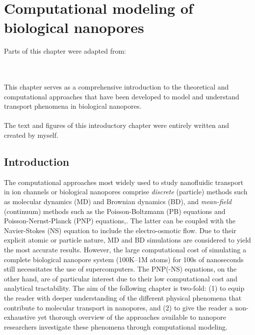 %
\chapter{Computational modeling of biological nanopores}
%
\label{ch:modelling}
%



\begin{shaded}
Parts of this chapter were adapted from:\\
\\
\\
\newpage
\end{shaded}

This chapter serves as a comprehensive introduction to the theoretical and computational approaches that have been developed to model and understand transport phenomena in biological nanopores. \\
\\
The text and figures of this introductory chapter were entirely written and created by myself.


\section{Introduction}

The computational approaches most widely used to study nanofluidic transport in ion channels or biological
nanopores comprise \emph{discrete} (particle) methods such as molecular dynamics
(MD)\cite{Lynden-Bell-1996,Allen-1999,Aksimentiev-2005,Luan-2008,Bhattacharya-2011,Zhang-2014,DiMarino-2015,Belkin-2016}
and Brownian dynamics
(BD),\cite{Schirmer-1999,Im-2002,Noskov-2004,Millar-2008,Egwolf-2010,DeBiase-2015,Pederson-2015} and
\emph{mean-field} (continuum) methods such as the Poisson-Boltzmann (PB)
equations\cite{Grochowski-2008,Baldessari-2008-1} and Poisson-Nernst-Planck (PNP)
equations,\cite{Eisenberg-1996,Gillespie-2002,Simakov-2010}. The latter can be coupled with the Navier-Stokes
(NS) equation to include the electro-osmotic flow.\cite{Lu-2012,Pederson-2015} Due to their explicit atomic or
particle nature, MD and BD simulations are considered to yield the most accurate results. However, the large
computational cost of simulating a complete biological nanopore system (100K--1M atoms) for 100s of
nanoseconds still necessitates the use of supercomputers.\cite{Aksimentiev-2005,Bhattacharya-2011} The
PNP(-NS) equations, on the other hand, are of particular interest due to their low computational cost and
analytical tractability. The aim of the following chapter is two-fold: (1) to equip the reader with deeper
understanding of the different physical phenomena that contribute to molecular transport in nanopores, and
(2) to give the reader a non-exhaustive yet thorough overview of the approaches available to nanopore
researchers investigate these phenomena through computational modeling.

